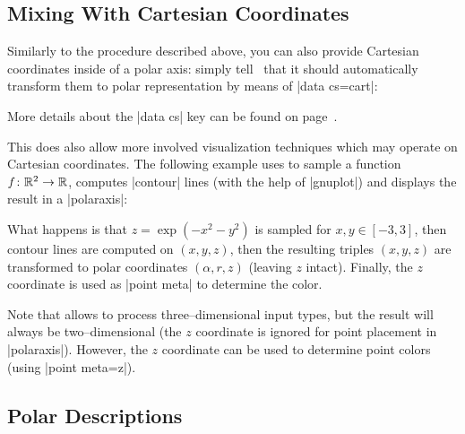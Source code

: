 {\subsection{Mixing With Cartesian Coordinates}
\label{sec:polar:cart}
Similarly to the procedure described above, you can also provide Cartesian coordinates inside of a polar axis: simply tell \PGFPlots\ that it should automatically transform them to polar representation by means of |data cs=cart|:
\begin{codeexample}[]
\end{codeexample}
\noindent More details about the |data cs| key can be found on page~\pageref{key:data:cs}.

This does also allow more involved visualization techniques which may operate on Cartesian coordinates. The following example uses  to sample a function $f\colon \mathbb{R}^2 \to \mathbb{R}$, computes |contour| lines (with the help of |gnuplot|) and displays the result in a |polaraxis|:
\pgfplotsexpensiveexample
\begin{codeexample}[]
\end{codeexample}
\noindent What happens is that $z=\exp(-x^2-y^2)$ is sampled for $x,y \in [-3,3]$, then contour lines are computed on $(x,y,z)$, then the resulting triples $(x,y,z)$ are transformed to polar coordinates $(\alpha,r,z)$ (leaving $z$ intact). Finally, the $z$ coordinate is used as |point meta| to determine the color.

Note that  allows to process three--dimensional input types, but the result will always be two--dimensional (the $z$ coordinate is ignored for point placement in |polaraxis|). However, the $z$ coordinate can be used to determine point colors (using |point meta=z|).

\subsection{Polar Descriptions}

}
